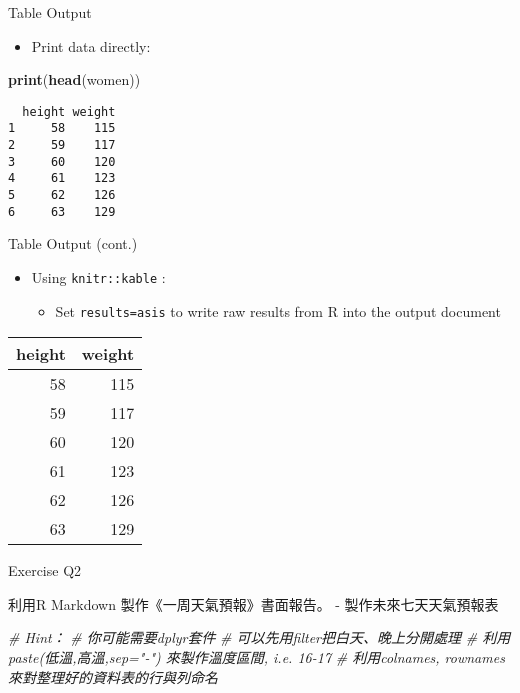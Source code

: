 \documentclass[ignorenonframetext,]{beamer}
\newenvironment{Shaded}{\begin{snugshade}}{\end{snugshade}}
\newcommand{\KeywordTok}[1]{\textcolor[rgb]{0.13,0.29,0.53}{\textbf{#1}}}
\newcommand{\CommentTok}[1]{\textcolor[rgb]{0.56,0.35,0.01}{\textit{#1}}}
\newcommand{\NormalTok}[1]{#1}
\providecommand{\tightlist}{%
  \setlength{\itemsep}{0pt}\setlength{\parskip}{0pt}}
\begin{document}
\begin{frame}[fragile]{Table Output}

\begin{itemize}
\tightlist
\item
  Print data directly:
\end{itemize}

\begin{Shaded}
\begin{Highlighting}[]
\KeywordTok{print}\NormalTok{(}\KeywordTok{head}\NormalTok{(women))}
\end{Highlighting}
\end{Shaded}

\begin{verbatim}
  height weight
1     58    115
2     59    117
3     60    120
4     61    123
5     62    126
6     63    129
\end{verbatim}

\end{frame}

\begin{frame}[fragile]{Table Output (cont.)}

\begin{itemize}
\tightlist
\item
  Using \texttt{knitr::kable} :

  \begin{itemize}
  \tightlist
  \item
    Set \texttt{results=\textquotesingle{}asis\textquotesingle{}} to
    write raw results from R into the output document\\
  \end{itemize}
\end{itemize}

\begin{longtable}[]{@{}rr@{}}
\toprule
height & weight\tabularnewline
\midrule
\endhead
58 & 115\tabularnewline
59 & 117\tabularnewline
60 & 120\tabularnewline
61 & 123\tabularnewline
62 & 126\tabularnewline
63 & 129\tabularnewline
\bottomrule
\end{longtable}

\end{frame}

\begin{frame}[fragile]{Exercise Q2}

利用R Markdown 製作《一周天氣預報》書面報告。 - 製作未來七天天氣預報表

\begin{Shaded}
\begin{Highlighting}[]
\CommentTok{# Hint：}
\CommentTok{# 你可能需要dplyr套件}
\CommentTok{# 可以先用filter把白天、晚上分開處理}
\CommentTok{# 利用 paste(低溫,高溫,sep="-") 來製作溫度區間, i.e. 16-17}
\CommentTok{# 利用colnames, rownames來對整理好的資料表的行與列命名}
\end{Highlighting}
\end{Shaded}

\end{frame}
\end{document}

